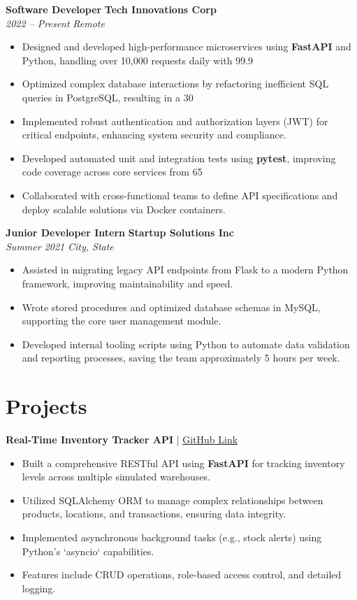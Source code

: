 \documentclass[10pt, letterpaper]{article}
\newcommand{\jobentry}[4]{
    \vspace{4pt}
    \textbf{#1} \hfill \textbf{#2} \\
    \textit{#3} \hfill \textit{#4}
    \vspace{2pt}
}
\begin{document}
\jobentry{Software Developer}{Tech Innovations Corp}{2022 – Present}{Remote}
\begin{itemize}
    \item Designed and developed high-performance microservices using \textbf{FastAPI} and Python, handling over 10,000 requests daily with 99.9%
    \item Optimized complex database interactions by refactoring inefficient SQL queries in PostgreSQL, resulting in a 30%
    \item Implemented robust authentication and authorization layers (JWT) for critical endpoints, enhancing system security and compliance.
    \item Developed automated unit and integration tests using \textbf{pytest}, improving code coverage across core services from 65%
    \item Collaborated with cross-functional teams to define API specifications and deploy scalable solutions via Docker containers.
\end{itemize}

\jobentry{Junior Developer Intern}{Startup Solutions Inc}{Summer 2021}{City, State}
\begin{itemize}
    \item Assisted in migrating legacy API endpoints from Flask to a modern Python framework, improving maintainability and speed.
    \item Wrote stored procedures and optimized database schemas in MySQL, supporting the core user management module.
    \item Developed internal tooling scripts using Python to automate data validation and reporting processes, saving the team approximately 5 hours per week.
\end{itemize}

\section*{Projects}
\textbf{Real-Time Inventory Tracker API} | \href{https://github.com/punyamittal/inventory-api}{GitHub Link}
\begin{itemize}
    \item Built a comprehensive RESTful API using \textbf{FastAPI} for tracking inventory levels across multiple simulated warehouses.
    \item Utilized SQLAlchemy ORM to manage complex relationships between products, locations, and transactions, ensuring data integrity.
    \item Implemented asynchronous background tasks (e.g., stock alerts) using Python's `asyncio` capabilities.
    \item Features include CRUD operations, role-based access control, and detailed logging.
\end{itemize}
\end{document}
